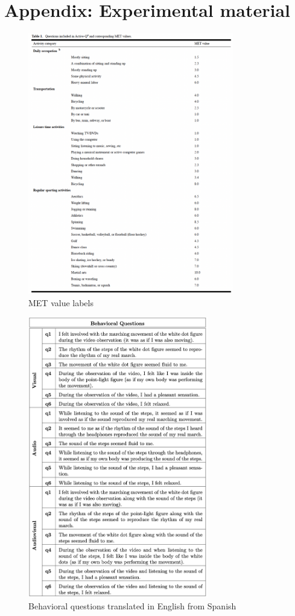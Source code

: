 \chapter*{Appendix: Experimental material}
\begin{figure}[ht]
    \centering
    \includegraphics[width=0.8\textwidth]{appendix/met_values.png}
    \caption{MET value labels \parencite{Bonn_2012}}
    \label{fig: met_values}
\end{figure}
\begin{figure}[ht]
    \centering
    \includegraphics[width=0.70\textwidth]{appendix/questions.png}
    \caption{Behavioral questions translated in English from Spanish}
    \label{fig: Behavioral questions}
\end{figure}
